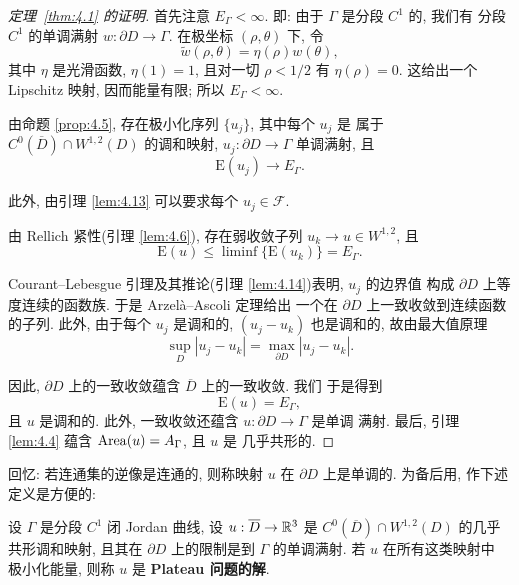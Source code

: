 \begin{proof}[定理~\ref{thm:4.1} 的证明]
首先注意 $E_\Gamma<\infty$. 即: 由于 $\Gamma$ 是分段 $C^1$ 的, 我们有
分段 $C^1$ 的单调满射 $w:\partial D\to\Gamma$. 在极坐标
$(\rho,\theta)$ 下, 令
\begin{equation*}
\tilde{w}(\rho,\theta)=\eta(\rho)w(\theta),
\end{equation*}
其中 $\eta$ 是光滑函数, $\eta(1)=1$, 且对一切 $\rho<1/2$ 有
$\eta(\rho)=0$. 这给出一个 Lipschitz 映射, 因而能量有限; 所以
$E_\Gamma<\infty$.

由命题 \ref{prop:4.5}, 存在极小化序列 $\{u_j\}$, 其中每个 $u_j$ 是
属于 $C^0(\overline{D})\cap W^{1,2}(D)$ 的调和映射, $u_j:\partial D\to\Gamma$
单调满射, 且
\begin{equation*}
\mathrm{E}(u_j)\to E_\Gamma.
\end{equation*}

此外, 由引理 \ref{lem:4.13} 可以要求每个 $u_j\in\mathcal{F}$.

由 Rellich 紧性(引理 \ref{lem:4.6}), 存在弱收敛子列 $u_k\to u\in W^{1,2}$,
且
\begin{equation*}
\mathrm{E}(u)\leq\liminf\{\mathrm{E}(u_k)\}=E_\Gamma.
\end{equation*}

Courant--Lebesgue 引理及其推论(引理 \ref{lem:4.14})表明, $u_j$ 的边界值
构成 $\partial D$ 上等度连续的函数族. 于是 Arzel\`a--Ascoli 定理给出
一个在 $\partial D$ 上一致收敛到连续函数的子列. 此外, 由于每个 $u_j$
是调和的, $(u_j-u_k)$ 也是调和的, 故由最大值原理
\begin{equation*}
\sup_D|u_j-u_k|=\max_{\partial D}|u_j-u_k|.
\end{equation*}

因此, $\partial D$ 上的一致收敛蕴含 $\overline{D}$ 上的一致收敛. 我们
于是得到
\begin{equation*}
\mathrm{E}(u)=E_\Gamma,
\end{equation*}
且 $u$ 是调和的. 此外, 一致收敛还蕴含 $u:\partial D\to\Gamma$ 是单调
满射. 最后, 引理 \ref{lem:4.4} 蕴含 $\operatorname{Area}(u)=A_\Gamma$, 且 $u$ 是
几乎共形的.
\end{proof}

回忆: 若连通集的逆像是连通的, 则称映射 $u$ 在 $\partial D$ 上是单调的.
为备后用, 作下述定义是方便的:

\begin{definition}
\label{def:4.15}
设 $\Gamma$ 是分段 $C^1$ 闭 Jordan 曲线, 设 $u:\overline{D}\to\mathbb{R}^3$ 是
$C^0(\overline{D})\cap W^{1,2}(D)$ 的几乎共形调和映射, 且其在
$\partial D$ 上的限制是到 $\Gamma$ 的单调满射. 若 $u$ 在所有这类映射中
极小化能量, 则称 $u$ 是 \textbf{Plateau 问题的解}.
\end{definition}

